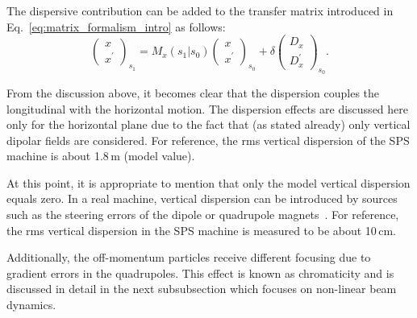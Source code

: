 
The dispersive contribution can be added to the transfer matrix introduced in Eq.~\eqref{eq:matrix_formalism_intro} as follows:
\begin{equation}\label{eq:matrix_formalism_dispersion}
    \begin{pmatrix}
     x\\ 
     x^\prime
     \end{pmatrix}_{s_1} = M_x (s_1 |  s_0) \begin{pmatrix}
     x\\ 
     x^\prime
     \end{pmatrix}_{s_0} + \delta \begin{pmatrix}
        D_x\\ 
        D_x^\prime
        \end{pmatrix}_{s_0}.
 \end{equation}


 From the discussion above, it becomes clear that the dispersion couples the longitudinal with the horizontal motion. The dispersion effects are discussed here only for the horizontal plane due to the fact that (as stated already) only vertical dipolar fields are considered. For reference, the rms vertical dispersion of the SPS machine is about 1.8\,m (model value). %
 
 At this point, it is appropriate to mention that only the model vertical dispersion equals zero. In a real machine, vertical dispersion can be introduced by sources such as the steering errors of the dipole or quadrupole magnets~\cite{Wolski_uspas}. For reference, the rms vertical dispersion in the SPS machine is measured to be about 10\,cm.

Additionally, the off-momentum particles receive different focusing due to gradient errors in the quadrupoles. This effect is known as chromaticity and is discussed in detail in the next subsubsection which focuses on non-linear beam dynamics.

